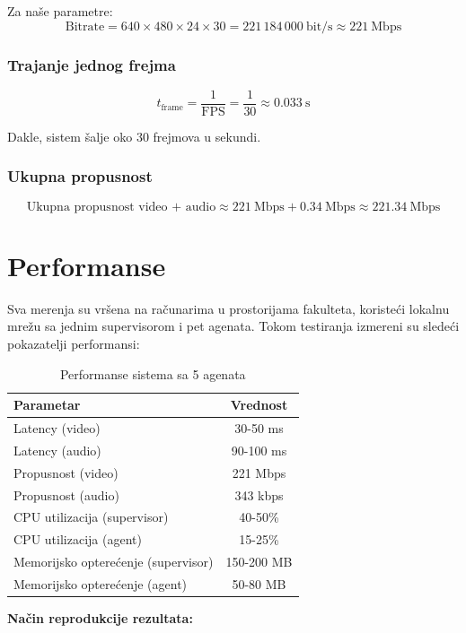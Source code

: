 \documentclass[a4paper,12pt]{article}
\begin{document}
Za naše parametre:
\[
\text{Bitrate} = 640 \times 480 \times 24 \times 30 = 221\,184\,000~\text{bit/s} \approx 221~\text{Mbps}
\]

\subsubsection*{Trajanje jednog frejma}

\[
t_\text{frame} = \frac{1}{\text{FPS}} = \frac{1}{30} \approx 0.033~\text{s}
\]

Dakle, sistem šalje oko 30 frejmova u sekundi.

\subsubsection*{Ukupna propusnost}

\[
\text{Ukupna propusnost video + audio} \approx 221~\text{Mbps} + 0.34~\text{Mbps} \approx 221.34~\text{Mbps}
\]

\section{Performanse}

Sva merenja su vršena na računarima u prostorijama fakulteta, koristeći lokalnu mrežu sa jednim supervisorom i pet agenata. Tokom testiranja izmereni su sledeći pokazatelji performansi:

\begin{table}[htb]
\centering
\caption{Performanse sistema sa 5 agenata}
\medskip
\label{tab:performanse}
\begin{tabular}{l | c}
\hline
Parametar & Vrednost \\ 
\hline
\hline
Latency (video) & 30-50 ms \\ 
Latency (audio) & 90-100 ms \\ 
Propusnost (video) & 221 Mbps \\ 
Propusnost (audio) & 343 kbps \\ 
CPU utilizacija (supervisor) & 40-50\% \\ 
CPU utilizacija (agent) & 15-25\% \\ 
Memorijsko opterećenje (supervisor) & 150-200 MB \\ 
Memorijsko opterećenje (agent) & 50-80 MB \\ 
\hline
\end{tabular}
\end{table}

\noindent
\noindent
\textbf{Način reprodukcije rezultata:}
\end{document}
